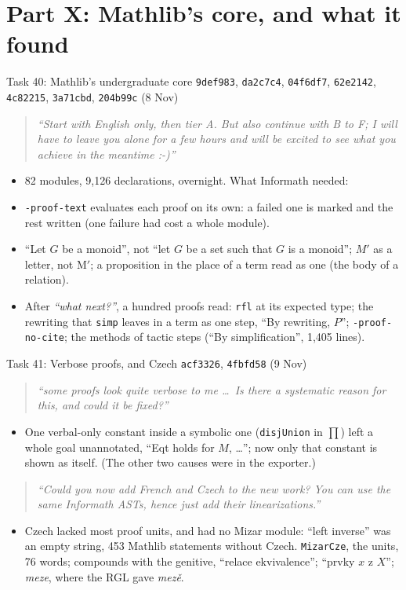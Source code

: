 \documentclass[10pt,aspectratio=169]{beamer}
\newcommand{\bad}[1]{\textcolor{warn}{#1}}
\newcommand{\ok}[1]{\textcolor{good}{#1}}
\newcommand{\commit}[1]{\texttt{\footnotesize #1}}
\newcommand{\prompt}[1]{\begin{quote}\small\itshape ``#1''\end{quote}}
\begin{document}
\section{Part X: Mathlib's core, and what it found}

\begin{frame}{Task 40: Mathlib's undergraduate core}
  \commit{9def983}, \commit{da2c7c4}, \commit{04f6df7}, \commit{62e2142}, \commit{4c82215},
  \commit{3a71cbd}, \commit{204b99c} (8 Nov)
  \prompt{Start with English only, then tier A. But also continue with B to F; I will have to
  leave you alone for a few hours and will be excited to see what you achieve in the meantime :-)}
  \begin{itemize}\small
    \item 82 modules, 9,126 declarations, overnight. What Informath needed:
    \item \texttt{-proof-text} evaluates each proof on its own: a failed one is marked and the
          rest written (one failure had cost a whole module).
    \item \ok{``Let $G$ be a monoid''}, not ``let $G$ be a set such that $G$ is a monoid'';
          $M'$ as a letter, not $\mathrm{M'}$; a proposition in the place of a term read as
          one (the body of a relation).
    \item After \textit{``what next?''}, a hundred proofs read: \texttt{rfl} at its expected
          type; the rewriting that \texttt{simp} leaves in a term as one step,
          \ok{``By rewriting, $P$''}; \texttt{-proof-no-cite}; the methods of tactic steps
          (``By simplification'', 1,405 lines).
  \end{itemize}
\end{frame}

\begin{frame}{Task 41: Verbose proofs, and Czech}
  \commit{acf3326}, \commit{4fbfd58} (9 Nov)
  \prompt{some proofs look quite verbose to me \ldots\ Is there a systematic reason for
  this, and could it be fixed?}
  \begin{itemize}\small
    \item One verbal-only constant inside a symbolic one (\texttt{disjUnion} in
          $\prod$) left a whole goal \bad{unannotated}, ``Eqt holds for $M$, \ldots''; now only
          that constant is shown as itself. (The other two causes were in the exporter.)
  \end{itemize}
  \prompt{Could you now add French and Czech to the new work? You can use the same Informath
  ASTs, hence just add their linearizations.}
  \begin{itemize}\small
    \item Czech lacked most proof units, and \bad{had no Mizar module}: ``left inverse'' was
          an \bad{empty string}, 453 Mathlib statements without Czech. \texttt{MizarCze}, the
          units, 76 words; compounds with the genitive, \ok{``relace ekvivalence''}; ``prvky $x$
          \ok{z} $X$''; \emph{meze}, where the RGL gave \bad{\emph{mezě}}.
  \end{itemize}
\end{frame}
\end{document}
